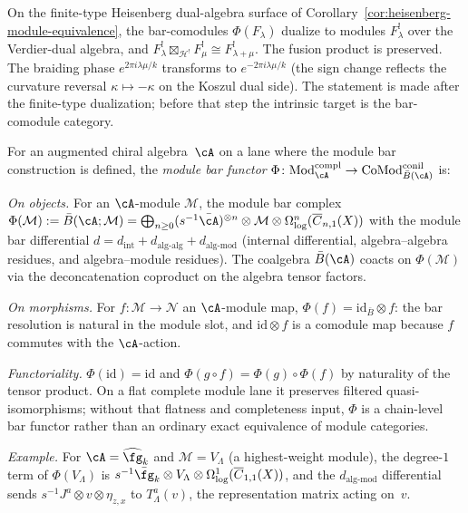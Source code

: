 \begin{remark}
\label{rem:fusion-koszul}
On the finite-type Heisenberg dual-algebra surface of
Corollary~\ref{cor:heisenberg-module-equivalence}, the
bar-comodules $\Phi(F_\lambda)$ dualize to modules $F_\lambda^!$
over the Verdier-dual algebra, and
$F_\lambda^! \boxtimes_{\mathcal{H}^!} F_\mu^! \cong
F_{\lambda+\mu}^!$. The fusion product is preserved. The braiding
phase $e^{2\pi i\lambda\mu/k}$ transforms to
$e^{-2\pi i\lambda\mu/k}$ (the sign change reflects the
curvature reversal $\kappa \mapsto -\kappa$ on the Koszul dual side).
The statement is made after the finite-type dualization; before that
step the intrinsic target is the bar-comodule category.
\end{remark}

\begin{definition}
\label{def:module-koszul-functor}
\label{def:koszul-module-categories}%
For an augmented chiral algebra~$\cA$ on a lane where the module bar
construction is defined, the \emph{module bar functor}
$\Phi\colon \mathrm{Mod}^{\mathrm{compl}}_{\cA}
\to \mathrm{CoMod}^{\mathrm{conil}}_{\bar{B}(\cA)}$
is:

\emph{On objects.} For an $\cA$-module $\mathcal{M}$, the module
bar complex
$\Phi(\mathcal{M}) := \bar{B}(\cA; \mathcal{M})
= \bigoplus_{n \ge 0}
(s^{-1}\bar{\cA})^{\otimes n} \otimes \mathcal{M}
\otimes \Omega^n_{\log}(\overline{C}_{n,1}(X))$
with the module bar differential
$d = d_{\mathrm{int}}+d_{\mathrm{alg\text{-}alg}}
+d_{\mathrm{alg\text{-}mod}}$
(internal differential, algebra--algebra residues, and
algebra--module residues).
The coalgebra $\bar{B}(\cA)$ coacts on $\Phi(\mathcal{M})$ via
the deconcatenation coproduct on the algebra tensor factors.

\emph{On morphisms.} For $f\colon \mathcal{M} \to \mathcal{N}$
an $\cA$-module map, $\Phi(f) = \mathrm{id}_{\bar{B}} \otimes f$:
the bar resolution is natural in the module slot, and
$\mathrm{id} \otimes f$ is a comodule map because $f$ commutes
with the $\cA$-action.

\emph{Functoriality.} $\Phi(\mathrm{id}) = \mathrm{id}$ and
$\Phi(g \circ f) = \Phi(g) \circ \Phi(f)$ by naturality of the
tensor product. On a flat complete module lane it preserves
filtered quasi-isomorphisms; without that flatness and completeness
input, $\Phi$ is a chain-level bar functor rather than an ordinary
exact equivalence of module categories.

\emph{Example.} For $\cA = \widehat{\fg}_k$ and
$\mathcal{M} = V_\Lambda$ (a highest-weight module), the
degree-$1$ term of $\Phi(V_\Lambda)$ is
$s^{-1}\bar{\fg}_k \otimes V_\Lambda \otimes
\Omega^1_{\log}(\overline{C}_{1,1}(X))$, and the
$d_{\mathrm{alg\text{-}mod}}$ differential sends
$s^{-1}J^a \otimes v \otimes \eta_{z,x}$ to
$T^a_\Lambda(v)$, the representation matrix acting on~$v$.
\end{definition}

